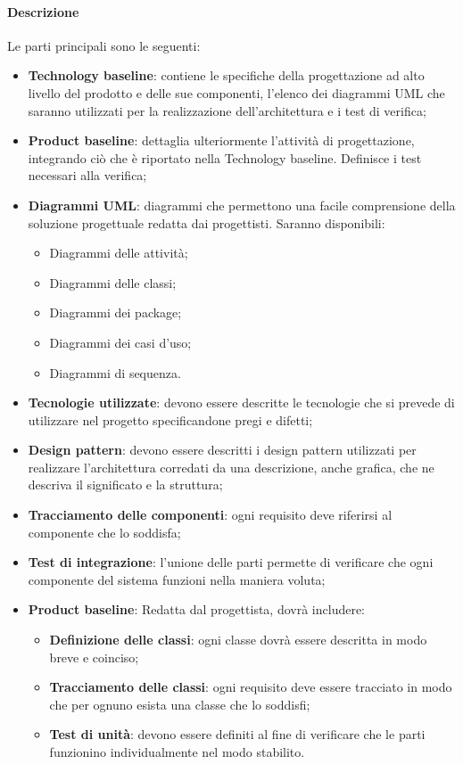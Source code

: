 \paragraph{Descrizione}
Le parti principali sono le seguenti:
\begin{itemize}
  \item \textbf{Technology baseline}: contiene le specifiche della progettazione ad alto livello del prodotto e delle sue componenti, l'elenco dei diagrammi UML che saranno utilizzati per la realizzazione dell'architettura e i test di verifica;

  \item \textbf{Product baseline}: dettaglia ulteriormente l'attività di progettazione,  integrando ciò che è riportato nella Technology baseline. Definisce i test necessari alla verifica;

  \item \textbf{Diagrammi UML}: diagrammi che permettono una facile comprensione della soluzione progettuale redatta dai progettisti. Saranno disponibili:
        \begin{itemize}
          \item Diagrammi delle attività;
          \item Diagrammi delle classi;
          \item Diagrammi dei package;
          \item Diagrammi dei casi d'uso;
          \item Diagrammi di sequenza.
        \end{itemize}
  \item \textbf{Tecnologie utilizzate}: devono essere descritte le tecnologie che si prevede di utilizzare nel progetto specificandone pregi e difetti;
  \item \textbf{Design pattern}: devono essere descritti i design pattern utilizzati per realizzare l'architettura corredati da una descrizione, anche grafica, che ne descriva il significato e la struttura;
  \item \textbf{Tracciamento delle componenti}: ogni requisito deve riferirsi al componente che lo soddisfa;
  \item \textbf{Test di integrazione}: l'unione delle parti permette di verificare che ogni componente del sistema funzioni nella maniera voluta;
  \item \textbf{Product baseline}: Redatta dal progettista, dovrà includere:
        \begin{itemize}
          \item \textbf{Definizione delle classi}: ogni classe dovrà essere descritta in modo breve e coinciso;
          \item \textbf{Tracciamento delle classi}: ogni requisito deve essere tracciato in modo che per ognuno esista una classe che lo soddisfi;
          \item \textbf{Test di unità}: devono essere definiti al fine di verificare che le parti funzionino individualmente nel modo stabilito.
        \end{itemize}
\end{itemize}

